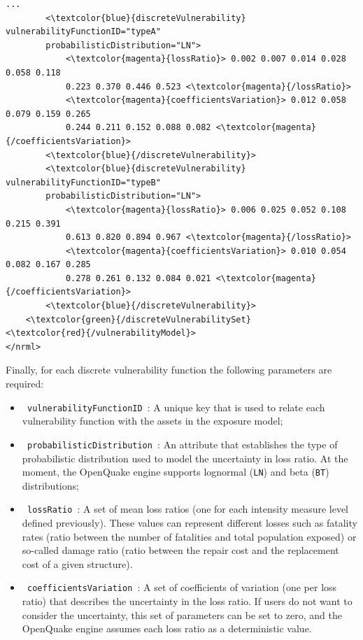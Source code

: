 \begin{Verbatim}[frame=single, commandchars=\\\{\}, samepage=true]
        ...
        <\textcolor{blue}{discreteVulnerability}  vulnerabilityFunctionID="typeA" 
        probabilisticDistribution="LN">
            <\textcolor{magenta}{lossRatio}> 0.002 0.007 0.014 0.028 0.058 0.118
            0.223 0.370 0.446 0.523 <\textcolor{magenta}{/lossRatio}>
            <\textcolor{magenta}{coefficientsVariation}> 0.012 0.058 0.079 0.159 0.265 
            0.244 0.211 0.152 0.088 0.082 <\textcolor{magenta}{/coefficientsVariation}>
        <\textcolor{blue}{/discreteVulnerability}>
        <\textcolor{blue}{discreteVulnerability}  vulnerabilityFunctionID="typeB" 
        probabilisticDistribution="LN">
            <\textcolor{magenta}{lossRatio}> 0.006 0.025 0.052 0.108 0.215 0.391	
            0.613 0.820 0.894 0.967 <\textcolor{magenta}{/lossRatio}>
            <\textcolor{magenta}{coefficientsVariation}> 0.010 0.054 0.082 0.167 0.285 
            0.278 0.261 0.132 0.084 0.021 <\textcolor{magenta}{/coefficientsVariation}>
        <\textcolor{blue}{/discreteVulnerability}>
    <\textcolor{green}{/discreteVulnerabilitySet} 
<\textcolor{red}{/vulnerabilityModel}>        
</nrml>
\end{Verbatim}

Finally, for each discrete \gls{vulnerability function} the following parameters are required:
\begin{itemize}
\item  \Verb+ vulnerabilityFunctionID +: A unique key that is used to relate each \gls{vulnerability function} with the \glspl{asset} in the \gls{exposure model};
\item  \Verb+ probabilisticDistribution +: An attribute that establishes the type of probabilistic distribution used to model the uncertainty in loss ratio. At the moment, the OpenQuake engine supports lognormal (\Verb+LN+) and beta (\Verb+BT+) distributions;
\item  \Verb+ lossRatio +: A set of mean loss ratios (one for each intensity measure level defined previously). These values can represent different losses such as fatality rates (ratio between the number of fatalities and total population exposed) or so-called damage ratio (ratio between the repair cost and the replacement cost of a given structure).
\item  \Verb+ coefficientsVariation +: A set of coefficients of variation (one per loss ratio) that describes the uncertainty in the loss ratio. If users do not want to consider the uncertainty, this set of parameters can be set to zero, and the OpenQuake engine assumes each loss ratio as a deterministic value. 
\end{itemize}

